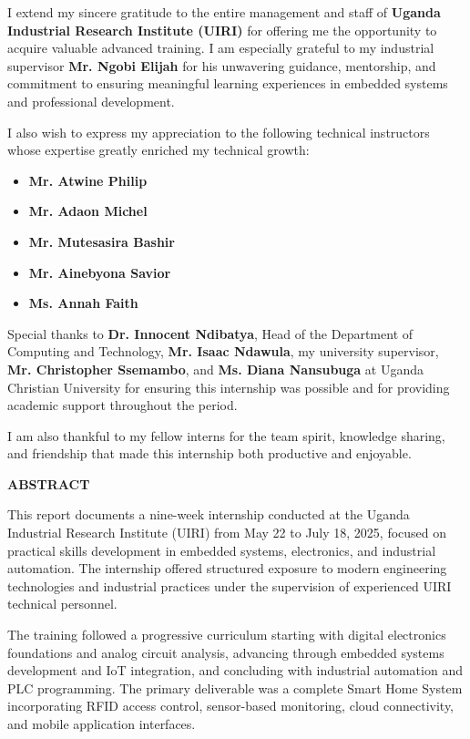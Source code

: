 \documentclass[12pt,a4paper]{report}
\begin{document}
\noindent I extend my sincere gratitude to the entire management and staff of \textbf{Uganda Industrial Research Institute (UIRI)} for offering me the opportunity to acquire valuable advanced training. I am especially grateful to my industrial supervisor \textbf{Mr. Ngobi Elijah} for his unwavering guidance, mentorship, and commitment to ensuring meaningful learning experiences in embedded systems and professional development.

\noindent I also wish to express my appreciation to the following technical instructors whose expertise greatly enriched my technical growth:
\begin{itemize}
    \item \textbf{Mr. Atwine Philip}
    \item \textbf{Mr. Adaon Michel}
    \item \textbf{Mr. Mutesasira Bashir}
    \item \textbf{Mr. Ainebyona Savior}
    \item \textbf{Ms. Annah Faith}
\end{itemize}

\noindent Special thanks to \textbf{Dr. Innocent Ndibatya}, Head of the Department of Computing and Technology, \textbf{Mr. Isaac Ndawula}, my university supervisor, \textbf{Mr. Christopher Ssemambo}, and \textbf{Ms. Diana Nansubuga} at Uganda Christian University for ensuring this internship was possible and for providing academic support throughout the period.

\noindent I am also thankful to my fellow interns for the team spirit, knowledge sharing, and friendship that made this internship both productive and enjoyable.

\newpage
{\fontsize{14}{16.8}\selectfont\bfseries\centering ABSTRACT\par}
\vspace{10pt}
\noindent This report documents a nine-week internship conducted at the Uganda Industrial Research Institute (UIRI) from May 22 to July 18, 2025, focused on practical skills development in embedded systems, electronics, and industrial automation. The internship offered structured exposure to modern engineering technologies and industrial practices under the supervision of experienced UIRI technical personnel.

\noindent The training followed a progressive curriculum starting with digital electronics foundations and analog circuit analysis, advancing through embedded systems development and IoT integration, and concluding with industrial automation and PLC programming. The primary deliverable was a complete Smart Home System incorporating RFID access control, sensor-based monitoring, cloud connectivity, and mobile application interfaces.
\end{document}
